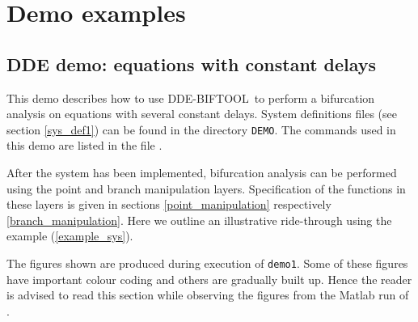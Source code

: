 \documentclass[10pt]{article}
\gdef \DDEBIFCODE{{\scshape DDE-BIFTOOL}}
\gdef \file#1{{\bfseries{\ttfamily{#1}}}}
\begin{document}
{\section{Demo examples}\label{demo}

\subsection{DDE demo: equations with constant delays}
\label{ride-through}
This demo describes how to use \DDEBIFCODE\ to perform a bifurcation analysis on equations
with several constant delays.  System definitions files  (see section \ref{sys_def1}) can be
found in the directory \verb$DEMO$.  The commands used in this demo are listed in the file 
\file{demo1.m}.

After the system has been implemented,
bifurcation analysis can be performed using 
the point and branch manipulation layers. Specification
of the functions in these layers is given in sections \ref{point_manipulation}
respectively \ref{branch_manipulation}.
Here we outline an illustrative ride-through 
using the example (\ref{example_sys}).

The figures shown are produced during execution of \verb$demo1$. Some of these
figures have important colour coding and others are gradually built up.
Hence the reader is advised to read this section while observing
the figures from the Matlab run of \file{demo1}.

}
\end{document}
